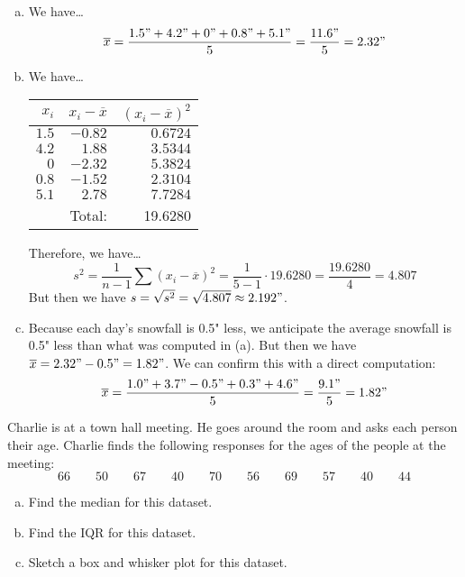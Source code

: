 \documentclass[11pt,letterpaper]{article}
\begin{document}
\sol 
\begin{enumerate}[(a)]
\item We have\dots
	\[
	\overline{x}= \dfrac{1.5" + 4.2" + 0" + 0.8" + 5.1"}{5}= \dfrac{11.6"}{5}= 2.32"
	\] \pspace

\item We have\dots \par
	\begin{table}[!ht]
	\centering
	\begin{tabular}{r|r|r}
	$x_i$ & $x_i - \overline{x}$ & $(x_i - \overline{x})^2$ \\ \hline
	$1.5$ & $-0.82$ & $0.6724$ \\
	$4.2$ & $1.88$ & $3.5344$ \\
	$0$ & $-2.32$ & $5.3824$ \\
	$0.8$ & $-1.52$ & $2.3104$ \\
	$5.1$ & $2.78$ & $7.7284$ \\ \hline
	& Total: & 19.6280
	\end{tabular}
	\end{table} \par
Therefore, we have\dots
	\[
	s^2= \dfrac{1}{n - 1} \sum (x_i - \overline{x})^2= \dfrac{1}{5 - 1} \cdot 19.6280= \dfrac{19.6280}{4}= 4.807
	\]
But then we have $s= \sqrt{s^2}= \sqrt{4.807} \approx 2.192"$. \pspace

\item Because each day's snowfall is 0.5" less, we anticipate the average snowfall is 0.5" less than what was computed in (a). But then we have $\overline{x}= 2.32" - 0.5"= 1.82"$. We can confirm this with a direct computation:
	\[
	\overline{x}= \dfrac{1.0" + 3.7" - 0.5" + 0.3" + 4.6"}{5}= \dfrac{9.1"}{5}= 1.82"
	\]
\end{enumerate}



\newpage



 Charlie is at a town hall meeting. He goes around the room and asks each person their age. Charlie finds the following responses for the ages of the people at the meeting:
	\[
	66 \qquad 50 \qquad 67 \qquad 40 \qquad 70 \qquad 56 \qquad 69 \qquad 57 \qquad 40 \qquad 44
	\]

\begin{enumerate}[(a)]
\item Find the median for this dataset. 
\item Find the IQR for this dataset.
\item Sketch a box and whisker plot for this dataset. 
\end{enumerate} \pspace
\end{document}

